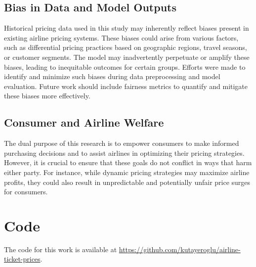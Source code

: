 \documentclass[conference]{IEEEtran}
\begin{document}
\subsection{Bias in Data and Model Outputs}
Historical pricing data used in this study may inherently reflect biases present in existing airline pricing systems. These biases could arise from various factors, such as differential pricing practices based on geographic regions, travel seasons, or customer segments. The model may inadvertently perpetuate or amplify these biases, leading to inequitable outcomes for certain groups. Efforts were made to identify and minimize such biases during data preprocessing and model evaluation. Future work should include fairness metrics to quantify and mitigate these biases more effectively.

\subsection{Consumer and Airline Welfare}
The dual purpose of this research is to empower consumers to make informed purchasing decisions and to assist airlines in optimizing their pricing strategies. However, it is crucial to ensure that these goals do not conflict in ways that harm either party. For instance, while dynamic pricing strategies may maximize airline profits, they could also result in unpredictable and potentially unfair price surges for consumers. 


\section{Code}
The code for this work is available at \url{https://github.com/kutayeroglu/airline-ticket-prices}.
\end{document}
